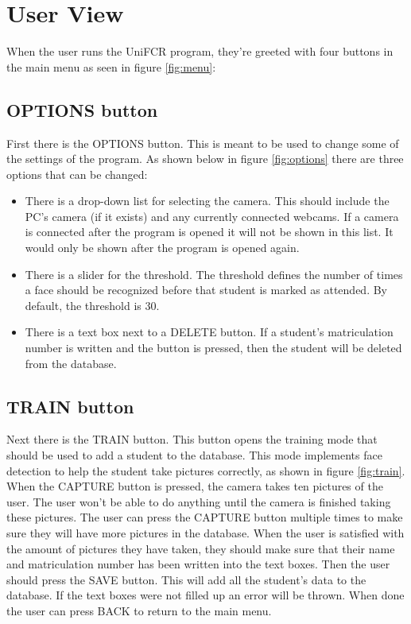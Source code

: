 \documentclass[12pt, a4paper]{article}
\begin{document}
\newpage



\section{User View}
When the user runs the UniFCR program, they're greeted with four buttons in the main menu as seen in figure \ref{fig:menu}:

\subsection{OPTIONS button}
First there is the OPTIONS button. This is meant to be used to change some of the settings of the program. As shown below in figure \ref{fig:options} there are three options that can be changed:
\begin{itemize}
\item There is a drop-down list for selecting the camera. This should include the PC’s camera (if it exists) and any currently connected webcams. If a camera is connected after the program is opened it will not be shown in this list. It would only be shown after the program is opened again. 
\item There is a slider for the threshold. The threshold defines the number of times a face should be recognized before that student is marked as attended. By default, the threshold is 30.
\item There is a text box next to a DELETE button. If a student’s matriculation number is written and the button is pressed, then the student will be deleted from the database.
\end{itemize}

\subsection{TRAIN button}
Next there is the TRAIN button. This button opens the training mode that should be used to add a student to the database. This mode implements face detection to help the student take pictures correctly, as shown in figure \ref{fig:train}. When the CAPTURE button is pressed, the camera takes ten pictures of the user. The user won’t be able to do anything until the camera is finished taking these pictures. The user can press the CAPTURE button multiple times to make sure they will have more pictures in the database. When the user is satisfied with the amount of pictures they have taken, they should make sure that their name and matriculation number has been written into the text boxes. Then the user should press the SAVE button. This will add all the student’s data to the database. If the text boxes were not filled up an error will be thrown. When done the user can press BACK to return to the main menu.
\end{document}
